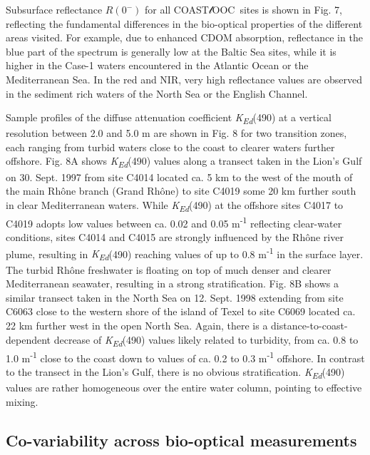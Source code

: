 \documentclass[essd, manuscript]{copernicus}
\newcommand{\coastlooc}{COAST$\mathscr{l}$OOC~\allowbreak}
\begin{document}
Subsurface reflectance $R(0^-)$ for all \coastlooc sites is shown in Fig. 7, reflecting the fundamental differences in the bio-optical properties of the different areas visited. For example, due to enhanced CDOM absorption, reflectance in the blue part of the spectrum is generally low at the Baltic Sea sites, while it is higher in the Case-1 waters encountered in the Atlantic Ocean or the Mediterranean Sea. In the red and NIR, very high reflectance values are observed in the sediment rich waters of the North Sea or the English Channel. 

Sample profiles of the diffuse attenuation coefficient \textit{K\textsubscript{Ed}}(490) at a vertical resolution between 2.0 and 5.0 m are shown in Fig. 8 for two transition zones, each ranging from turbid waters close to the coast to clearer waters further offshore. Fig. 8A shows \textit{K\textsubscript{Ed}}(490) values along a transect taken in the Lion's Gulf on 30. Sept. 1997 from site C4014 located ca. 5 km to the west of the mouth of the main Rhône branch (Grand Rhône) to site C4019 some 20 km further south in clear Mediterranean waters. While \textit{K\textsubscript{Ed}}(490) at the offshore sites C4017 to C4019 adopts low values between ca. 0.02 and 0.05 m\textsuperscript{-1} reflecting clear-water conditions, sites C4014 and C4015 are strongly influenced by the Rhône river plume, resulting in \textit{K\textsubscript{Ed}}(490) reaching values of up to 0.8 m\textsuperscript{-1} in the surface layer. The turbid Rhône freshwater is floating on top of much denser and clearer Mediterranean seawater, resulting in a strong stratification. Fig. 8B shows a similar transect taken in the North Sea on 12. Sept. 1998 extending from site C6063 close to the western shore of the island of Texel to site C6069 located ca. 22 km further west in the open North Sea. Again, there is a distance-to-coast-dependent decrease of \textit{K\textsubscript{Ed}}(490) values likely related to turbidity, from ca. 0.8 to 1.0 m\textsuperscript{-1} close to the coast down to values of ca. 0.2 to 0.3 m\textsuperscript{-1} offshore. In contrast to the transect in the Lion's Gulf, there is no obvious stratification. \textit{K\textsubscript{Ed}}(490) values are rather homogeneous over the entire water column, pointing to effective mixing.

\subsection{Co-variability across bio-optical measurements}
\end{document}
